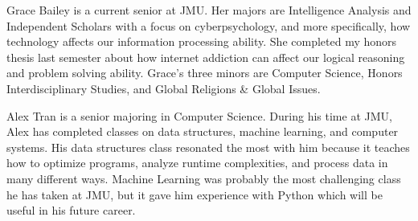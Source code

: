 \documentclass[11pt]{article}
\begin{document}
Grace Bailey is a current senior at JMU. Her majors are Intelligence Analysis and Independent Scholars with a focus on cyberpsychology, and more specifically, how technology affects our information processing ability. She completed my honors thesis last semester about how internet addiction can affect our logical reasoning and problem solving ability.  Grace's three minors are Computer Science, Honors Interdisciplinary Studies, and Global Religions \& Global Issues. 

Alex Tran is a senior majoring in Computer Science. During his time at JMU, Alex has completed classes on data structures, machine learning, and computer systems. His data structures class resonated the most with him because it teaches how to optimize programs, analyze runtime complexities, and process data in many different ways. Machine Learning was probably the most challenging class he has taken at JMU, but it gave him experience with Python which will be useful in his future career. 
\end{document}
